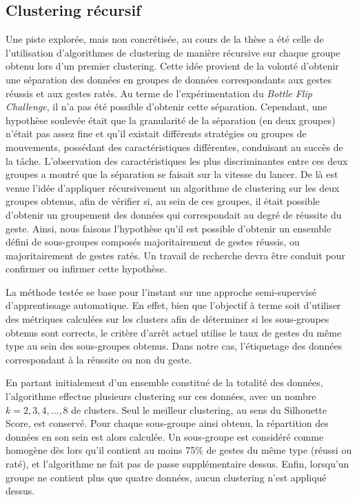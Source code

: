 \subsection{Clustering récursif}
Une piste explorée, mais non concrétisée, au cours de la thèse a été celle de l'utilisation d'algorithmes de clustering de manière récursive sur chaque groupe obtenu lors d'un premier clustering. Cette idée provient de la volonté d'obtenir une séparation des données en groupes de données correspondants aux gestes réussis et aux gestes ratés. Au terme de l'expérimentation du \textit{Bottle Flip Challenge}, il n'a pas été possible d'obtenir cette séparation. Cependant, une hypothèse soulevée était que la granularité de la séparation (en deux groupes) n'était pas assez fine et qu'il existait différents stratégies ou groupes de mouvements, possédant des caractéristiques différentes, conduisant au succès de la tâche. L'observation des caractéristiques les plus discriminantes entre ces deux groupes a montré que la séparation se faisait sur la vitesse du lancer. De là est venue l'idée d'appliquer récursivement un algorithme de clustering sur les deux groupes obtenus, afin de vérifier si, au sein de ces groupes, il était possible d'obtenir un groupement des données qui correspondait au degré de réussite du geste. Ainsi, nous faisons l'hypothèse qu'il est possible d'obtenir un ensemble défini de sous-groupes composés majoritairement de gestes réussis, ou  majoritairement de gestes ratés. Un travail de recherche devra être conduit pour confirmer ou infirmer cette hypothèse.

La méthode testée se base pour l'instant sur une approche semi-supervisé d'apprentissage automatique. En effet, bien que l'objectif à terme soit d'utiliser des métriques calculées sur les clusters afin de déterminer si les sous-groupes obtenus sont corrects, le critère d'arrêt actuel utilise le taux de gestes du même type au sein des sous-groupes obtenus. Dans notre cas, l'étiquetage des données correspondant à la réussite ou non du geste.

En partant initialement d'un ensemble constitué de la totalité des données, l'algorithme effectue plusieurs clustering sur ces données, avec un nombre $k = 2, 3, 4, \ldots, 8$ de clusters. Seul le meilleur clustering, au sens du Silhouette Score, est conservé. Pour chaque sous-groupe ainsi obtenu, la répartition des données en son sein est alors calculée. Un sous-groupe est considéré comme homogène dès lors qu'il contient au moins 75\% de gestes du même type (réussi ou raté), et l'algorithme ne fait pas de passe supplémentaire dessus. Enfin, lorsqu'un groupe ne contient plus que quatre données, aucun clustering n'est appliqué dessus.

